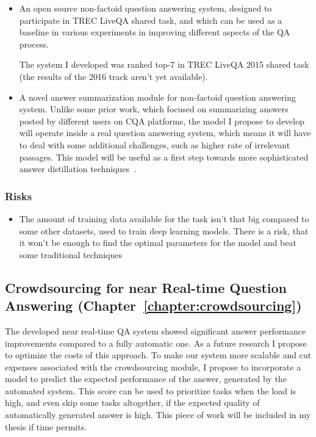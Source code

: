 \begin{itemize}
\item An open source non-factoid question answering system, designed to participate in TREC LiveQA shared task, and which can be used as a baseline in various experiments in improving different aspects of the QA process.

The system I developed was ranked top-7 in TREC LiveQA 2015 shared task (the results of the 2016 track aren't yet available).

\item A novel answer summarization module for non-factoid question answering system.
Unlike some prior work, which focused on summarizing answers posted by different users on CQA platforms, the model I propose to develop will operate inside a real question answering system, which means it will have to deal with some additional challenges, such as higher rate of irrelevant passages.
This model will be useful as a first step towards more sophisticated answer distillation techniques~\cite{mitra2016distillation}.

\end{itemize}

\subsubsection{Risks}
\label{section:proposal:plan:non-factoid:risks}

\begin{itemize}
\item The amount of training data available for the task isn't that big compared to some other datasets, used to train deep learning models. There is a risk, that it won't be enough to find the optimal parameters for the model and beat some traditional techniques
\end{itemize}

\subsection{Crowdsourcing for near Real-time Question Answering (Chapter~\ref{chapter:crowdsourcing})}
\label{section:proposal:plan:crowdsourcing}

The developed near real-time QA system showed significant answer performance improvements compared to a fully automatic one.
As a future research I propose to optimize the costs of this approach.
To make our system more scalable and cut expenses associated with the crowdsourcing module, I propose to incorporate a model to predict the expected performance of the answer, generated by the automated system.
This score can be used to prioritize tasks when the load is high, and even skip some tasks altogether, if the expected quality of automatically generated answer is high.
This piece of work will be included in my thesis if time permits.

